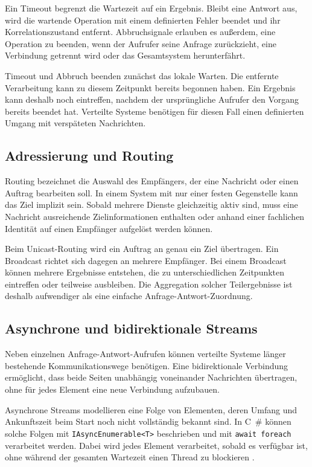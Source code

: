 Ein Timeout begrenzt die Wartezeit auf ein Ergebnis. Bleibt eine Antwort aus, wird die wartende Operation mit einem definierten Fehler beendet und ihr Korrelationszustand entfernt. Abbruchsignale erlauben es außerdem, eine Operation zu beenden, wenn der Aufrufer seine Anfrage zurückzieht, eine Verbindung getrennt wird oder das Gesamtsystem herunterfährt.

Timeout und Abbruch beenden zunächst das lokale Warten. Die entfernte Verarbeitung kann zu diesem Zeitpunkt bereits begonnen haben. Ein Ergebnis kann deshalb noch eintreffen, nachdem der ursprüngliche Aufrufer den Vorgang bereits beendet hat. Verteilte Systeme benötigen für diesen Fall einen definierten Umgang mit verspäteten Nachrichten.

\subsection{Adressierung und Routing}

Routing bezeichnet die Auswahl des Empfängers, der eine Nachricht oder einen Auftrag bearbeiten soll. In einem System mit nur einer festen Gegenstelle kann das Ziel implizit sein. Sobald mehrere Dienste gleichzeitig aktiv sind, muss eine Nachricht ausreichende Zielinformationen enthalten oder anhand einer fachlichen Identität auf einen Empfänger aufgelöst werden können.

Beim Unicast-Routing wird ein Auftrag an genau ein Ziel übertragen. Ein Broadcast richtet sich dagegen an mehrere Empfänger. Bei einem Broadcast können mehrere Ergebnisse entstehen, die zu unterschiedlichen Zeitpunkten eintreffen oder teilweise ausbleiben. Die Aggregation solcher Teilergebnisse ist deshalb aufwendiger als eine einfache Anfrage-Antwort-Zuordnung.

\subsection{Asynchrone und bidirektionale Streams}

Neben einzelnen Anfrage-Antwort-Aufrufen können verteilte Systeme länger bestehende Kommunikationswege benötigen. Eine bidirektionale Verbindung ermöglicht, dass beide Seiten unabhängig voneinander Nachrichten übertragen, ohne für jedes Element eine neue Verbindung aufzubauen.

Asynchrone Streams modellieren eine Folge von Elementen, deren Umfang und Ankunftszeit beim Start noch nicht vollständig bekannt sind. In C~\# können solche Folgen mit \texttt{IAsyncEnumerable<T>} beschrieben und mit \texttt{await foreach} verarbeitet werden. Dabei wird jedes Element verarbeitet, sobald es verfügbar ist, ohne während der gesamten Wartezeit einen Thread zu blockieren \cite{microsoftAsyncStreams}.

